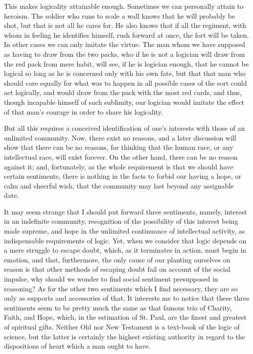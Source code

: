 This makes logicality attainable enough. Sometimes we can personally attain to heroism. The soldier who runs to scale a wall knows that he will probably be shot, but that is not all he cares for. He also knows that if all the regiment, with whom in feeling he identifies himself, rush forward at once, the fort will be taken. In other cases we can only imitate the virtue. The man whom we have supposed as having to draw from the two packs, who if he is not a logician will draw from the red pack from mere habit, will see, if he is logician enough, that he cannot be logical so long as he is concerned only with his own fate, but that that man who should care equally for what was to happen in all possible cases of the sort could act logically, and would draw from the pack with the most red cards, and thus, though incapable himself of such sublimity, our logician would imitate the effect of that man's courage in order to share his logicality.

But all this requires a conceived identification of one's interests with those of an unlimited community. Now, there exist no reasons, and a later discussion will show that there can be no reasons, for thinking that the human race, or any intellectual race, will exist forever. On the other hand, there can be no reason against it; and, fortunately, as the whole requirement is that we should have certain sentiments, there is nothing in the facts to forbid our having a hope, or calm and cheerful wish, that the community may last beyond any assignable date.

It may seem strange that I should put forward three sentiments, namely, interest in an indefinite community, recognition of the possibility of this interest being made supreme, and hope in the unlimited continuance of intellectual activity, as indispensable requirements of logic. Yet, when we consider that logic depends on a mere struggle to escape doubt, which, as it terminates in action, must begin in emotion, and that, furthermore, the only cause of our planting ourselves on reason is that other methods of escaping doubt fail on account of the social impulse, why should we wonder to find social sentiment presupposed in reasoning? As for the other two sentiments which I find necessary, they are so only as supports and accessories of that. It interests me to notice that these three sentiments seem to be pretty much the same as that famous trio of Charity, Faith, and Hope, which, in the estimation of St. Paul, are the finest and greatest of spiritual gifts. Neither Old nor New Testament is a text-book of the logic of science, but the latter is certainly the highest existing authority in regard to the dispositions of heart which a man ought to have.

